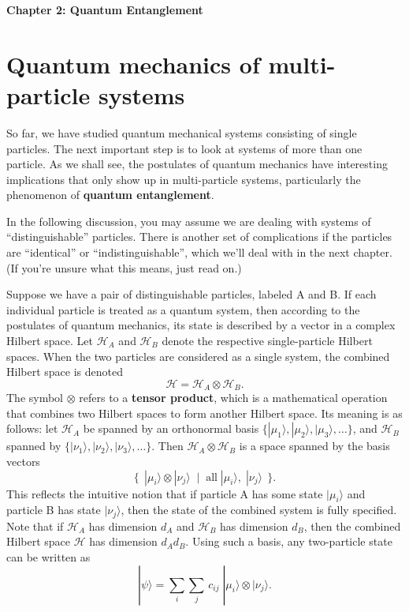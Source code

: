 \documentclass[pra,12pt]{revtex4}
\begin{document}
\begin{center}
{\Large \textbf{Chapter 2: Quantum Entanglement}}
\end{center}

\section{Quantum mechanics of multi-particle systems}

So far, we have studied quantum mechanical systems consisting of
single particles.  The next important step is to look at systems of
more than one particle.  As we shall see, the postulates of quantum
mechanics have interesting implications that only show up in
multi-particle systems, particularly the phenomenon of \textbf{quantum
  entanglement}.

In the following discussion, you may assume we are dealing with
systems of ``distinguishable'' particles.  There is another set of
complications if the particles are ``identical'' or
``indistinguishable'', which we'll deal with in the next chapter.  (If
you're unsure what this means, just read on.)

Suppose we have a pair of distinguishable particles, labeled A and B.
If each individual particle is treated as a quantum system, then
according to the postulates of quantum mechanics, its state is
described by a vector in a complex Hilbert space.  Let $\mathscr{H}_A$
and $\mathscr{H}_B$ denote the respective single-particle Hilbert
spaces.  When the two particles are considered as a single system, the
combined Hilbert space is denoted
$$\mathscr{H} = \mathscr{H}_A\otimes \mathscr{H}_B.$$
The symbol $\otimes$ refers to a \textbf{tensor product}, which is a
mathematical operation that combines two Hilbert spaces to form
another Hilbert space.  Its meaning is as follows: let $\mathscr{H}_A$
be spanned by an orthonormal basis $\{|\mu_1\rangle, |\mu_2\rangle,
|\mu_3\rangle, \dots\}$, and $\mathscr{H}_B$ spanned by
$\{|\nu_1\rangle, |\nu_2\rangle, |\nu_3\rangle, \dots\}$.  Then
$\mathscr{H}_A \otimes \mathscr{H}_B$ is a space spanned by the basis
vectors
$$\Big\{\;\,|\mu_i\rangle\otimes|\nu_j\rangle \;\;  \Big| \;\; \textrm{all}\;|\mu_i\rangle,\; |\nu_j\rangle \;\,\Big\}.$$
This reflects the intuitive notion that if particle A has some state
$|\mu_i\rangle$ and particle B has state $|\nu_j\rangle$, then the
state of the combined system is fully specified.  Note that if
$\mathscr{H}_A$ has dimension $d_A$ and $\mathscr{H}_B$ has dimension
$d_B$, then the combined Hilbert space $\mathscr{H}$ has dimension
$d_A d_B$.  Using such a basis, any two-particle state can be written as
$$|\psi\rangle = \sum_{i} \sum_{j} \, c_{ij}\; |\mu_i\rangle \otimes |\nu_j\rangle.$$
\end{document}

